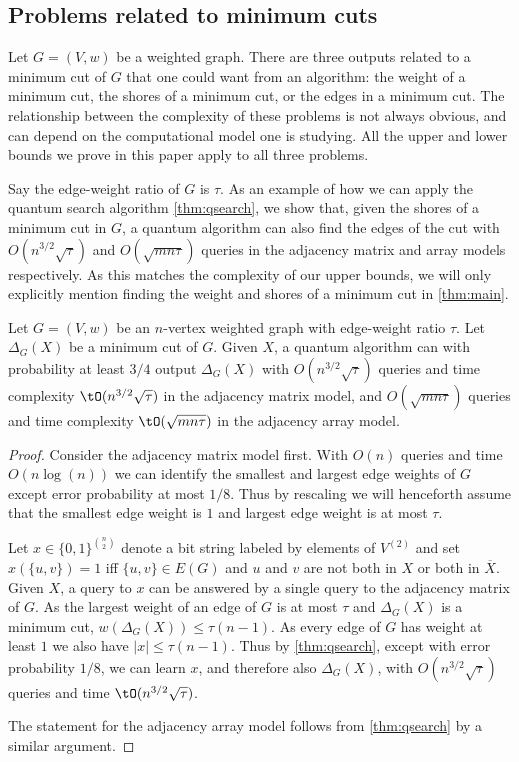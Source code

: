 \subsection{Problems related to minimum cuts}
Let $G=(V,w)$ be a weighted graph.  There are three outputs related to a minimum cut of $G$ that one could want 
from an algorithm: the weight of a minimum cut, the shores of a minimum cut, or the edges in a minimum cut.
The relationship between the complexity of these problems is not always obvious, and can depend on the computational 
model one is studying.  All the upper and lower bounds we prove in this paper apply to all three problems.

Say the edge-weight ratio of $G$ is $\tau$.
As an example of how we can apply the quantum search algorithm \cref{thm:qsearch}, 
we show that, given the shores of a minimum cut in $G$, a quantum algorithm can also find the edges of the cut with 
$O(n^{3/2} \sqrt{\tau})$ and $O(\sqrt{mn \tau})$ queries in the adjacency matrix and array models respectively.  As this matches the complexity of 
our upper bounds, we will only explicitly mention finding the weight and shores of a minimum cut
in \cref{thm:main}.  

\begin{proposition}
Let $G = (V,w)$ be an $n$-vertex weighted graph with edge-weight ratio $\tau$.   Let $\Delta_G(X)$ be a minimum cut of $G$.  
Given $X$, a quantum algorithm can with probability at least $3/4$ output $\Delta_G(X)$ with $O(n^{3/2}\sqrt{\tau})$ queries and time complexity $\tO(n^{3/2}\sqrt{\tau})$ in the adjacency matrix model, and $O(\sqrt{mn\tau})$ queries and time complexity $\tO(\sqrt{mn\tau})$ in the adjacency array model.
\end{proposition}

\begin{proof}
Consider the adjacency matrix model first.  With $O(n)$ queries and time $O(n \log(n))$ we can identify the smallest and largest edge weights of $G$ except error probability at most $1/8$.  Thus by rescaling we will 
henceforth assume that the smallest edge weight is $1$ and largest edge weight is at most $\tau$.

Let $x \in \{0,1\}^{\binom{n}{2}}$ denote a bit string labeled by elements of $V^{(2)}$ and set $x(\{u,v\}) = 1$ iff $\{u,v\} \in E(G)$ and $u$ and $v$ are not both in 
$X$ or both in $\overline{X}$.  Given $X$, a query to $x$ can be answered by a single query to the adjacency matrix of $G$.  As the largest weight of an edge of $G$ is at most $\tau$ and $\Delta_G(X)$ is a minimum cut, 
$w(\Delta_G(X)) \le \tau(n-1)$.  As every edge of $G$ has weight at least $1$ we also have $|x| \le \tau (n-1)$.  Thus by \cref{thm:qsearch}, except with error probability $1/8$, we can learn $x$, and therefore also $\Delta_G(X)$, with 
$O(n^{3/2}\sqrt{\tau})$ queries and time $\tO(n^{3/2}\sqrt{\tau})$.

The statement for the adjacency array model follows from \cref{thm:qsearch} by a similar argument. 
\end{proof}

